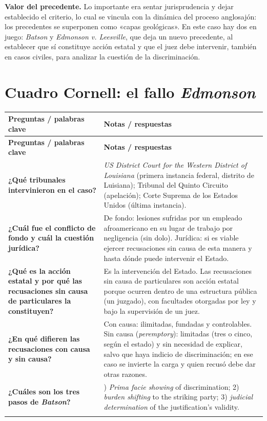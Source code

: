 \documentclass[12pt,oneside]{book}
\newcommand{\cornellrow}[2]{\textbf{#1} & #2 \\ \addlinespace[0.4em]}
\begin{document}
\textbf{Valor del precedente.} Lo importante era sentar jurisprudencia y dejar establecido el criterio, lo cual se vincula con la dinámica del proceso anglosajón: los precedentes se superponen como «capas geológicas». En este caso hay dos en juego: \textit{Batson} y \textit{Edmonson v. Leesville}, que deja un nuevo precedente, al establecer que sí constituye acción estatal y que el juez debe intervenir, también en casos civiles, para analizar la cuestión de la discriminación.

\section{Cuadro Cornell: el fallo \textit{Edmonson}}

\begin{longtable}{@{}>{\raggedright\arraybackslash}p{}>{\raggedright\arraybackslash}p{}@{}}
\toprule
\textbf{Preguntas / palabras clave} & \textbf{Notas / respuestas} \\
\midrule
\endfirsthead
\toprule
\textbf{Preguntas / palabras clave} & \textbf{Notas / respuestas} \\
\midrule
\endhead
\cornellrow{¿Qué tribunales intervinieron en el caso?}{\textit{US District Court for the Western District of Louisiana} (primera instancia federal, distrito de Luisiana); Tribunal del Quinto Circuito (apelación); Corte Suprema de los Estados Unidos (última instancia).}
\cornellrow{¿Cuál fue el conflicto de fondo y cuál la cuestión jurídica?}{De fondo: lesiones sufridas por un empleado afroamericano en su lugar de trabajo por negligencia (sin dolo). Jurídica: si es viable ejercer recusaciones sin causa de esta manera y hasta dónde puede intervenir el Estado.}
\cornellrow{¿Qué es la acción estatal y por qué las recusaciones sin causa de particulares la constituyen?}{Es la intervención del Estado. Las recusaciones sin causa de particulares son acción estatal porque ocurren dentro de una estructura pública (un juzgado), con facultades otorgadas por ley y bajo la supervisión de un juez.}
\cornellrow{¿En qué difieren las recusaciones con causa y sin causa?}{Con causa: ilimitadas, fundadas y controlables. Sin causa (\textit{peremptory}): limitadas (tres o cinco, según el estado) y sin necesidad de explicar, salvo que haya indicio de discriminación; en ese caso se invierte la carga y quien recusó debe dar otras razones.}
\cornellrow{¿Cuáles son los tres pasos de \textit{Batson}?}{1) \textit{Prima facie showing} of discrimination; 2) \textit{burden shifting} to the striking party; 3) \textit{judicial determination} of the justification's validity.}

\end{longtable}
\end{document}
